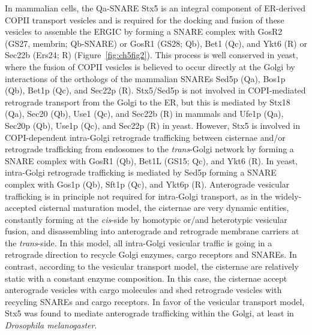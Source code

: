 In mammalian cells, the Qa-SNARE Stx5 is an integral component of ER-derived COPII transport vesicles and is required for the docking and fusion of these vesicles to assemble the ERGIC\cite{appenzeller-herzog_er-golgi_2006,bentley_snare_2006} by forming a SNARE complex with GosR2 (GS27, membrin; Qb-SNARE) or GosR1 (GS28; Qb), Bet1 (Qc), and Ykt6 (R) or Sec22b (Ers24; R) (Figure~\ref{fig:ch5fig2})\cite{xu_subunit_2000,zhang_ykt6_2001,dascher_syntaxin_1994,hay_mammalian_1996,hay_localization_1998,paek_ers-24_1997,zhang_mammalian_1997}. This process is well conserved in yeast, where the fusion of COPII vesicles is believed to occur directly at the Golgi\cite{barlowe_copii_1994} by interactions of the orthologs of the mammalian SNAREs Sed5p (Qa), Bos1p (Qb), Bet1p (Qc), and Sec22p (R)\cite{adolf_sec24c/d-isoformspecific_2016,newman_bet1_1990,sacher_synaptobrevin-related_1997}. Stx5/Sed5p is not involved in COPI-mediated retrograde transport from the Golgi to the ER, but this is mediated by Stx18 (Qa), Sec20 (Qb), Use1 (Qc), and Sec22b (R) in mammals and Ufe1p (Qa), Sec20p (Qb), Use1p (Qc), and Sec22p (R) in yeast\cite{malsam_organization_2011,burri_snare_2003,dilcher_use1p_2003}. However, Stx5 is involved in COPI-dependent intra-Golgi retrograde trafficking between cisternae and/or retrograde trafficking from endosomes to the \emph{trans}-Golgi network by forming a SNARE complex with GosR1 (Qb), Bet1L (GS15; Qc), and Ykt6 (R)\cite{malsam_organization_2011,zhang_ykt6_2001,hay_localization_1998,xu_gs15_2002,volchuk_countercurrent_2004,tai_participation_2004}. In yeast, intra-Golgi retrograde trafficking is mediated by Sed5p forming a SNARE complex with Gos1p (Qb), Sft1p (Qc), and Ykt6p (R)\cite{malsam_organization_2011,parlati_distinct_2002,banfield_snare-like_1995}. Anterograde vesicular trafficking is in principle not required for intra-Golgi transport, as in the widely-accepted cisternal maturation model, the cisternae are very dynamic entities, constantly forming at the \emph{cis}-side by homotypic or/and heterotypic vesicular fusion, and disassembling into anterograde and retrograde membrane carriers at the \emph{trans}-side\cite{cottam_retrograde_2012}. In this model, all intra-Golgi vesicular traffic is going in a retrograde direction to recycle Golgi enzymes, cargo receptors and SNAREs\cite{cottam_retrograde_2012}. In contrast, according to the vesicular transport model, the cisternae are relatively static with a constant enzyme composition. In this case, the cisternae accept anterograde vesicles with cargo molecules and shed retrograde vesicles with recycling SNAREs and cargo receptors\cite{cottam_retrograde_2012}. In favor of the vesicular transport model, Stx5 was found to mediate anterograde trafficking within the Golgi, at least in \emph{Drosophila melanogaster}\cite{satoh_roles_2016}.

